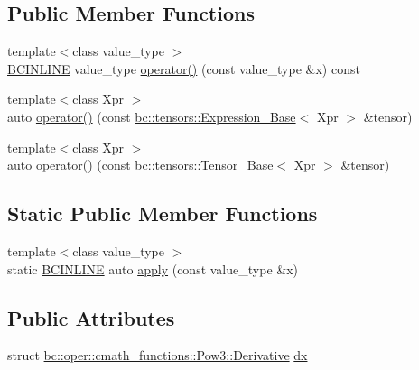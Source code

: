 \subsection*{Public Member Functions}
\begin{DoxyCompactItemize}
\item 
{\footnotesize template$<$class value\+\_\+type $>$ }\\\hyperlink{common_8h_a6699e8b0449da5c0fafb878e59c1d4b1}{B\+C\+I\+N\+L\+I\+NE} value\+\_\+type \hyperlink{structbc_1_1oper_1_1cmath__functions_1_1Pow3_a108deaaf09f199af0335f01bec74c858}{operator()} (const value\+\_\+type \&x) const
\item 
{\footnotesize template$<$class Xpr $>$ }\\auto \hyperlink{structbc_1_1oper_1_1cmath__functions_1_1Pow3_a98c1195eb689341c75c61c9f69c01a91}{operator()} (const \hyperlink{classbc_1_1tensors_1_1Expression__Base}{bc\+::tensors\+::\+Expression\+\_\+\+Base}$<$ Xpr $>$ \&tensor)
\item 
{\footnotesize template$<$class Xpr $>$ }\\auto \hyperlink{structbc_1_1oper_1_1cmath__functions_1_1Pow3_ac310abee8b6a40eb5bf6c2bed2395107}{operator()} (const \hyperlink{classbc_1_1tensors_1_1Tensor__Base}{bc\+::tensors\+::\+Tensor\+\_\+\+Base}$<$ Xpr $>$ \&tensor)
\end{DoxyCompactItemize}
\subsection*{Static Public Member Functions}
\begin{DoxyCompactItemize}
\item 
{\footnotesize template$<$class value\+\_\+type $>$ }\\static \hyperlink{common_8h_a6699e8b0449da5c0fafb878e59c1d4b1}{B\+C\+I\+N\+L\+I\+NE} auto \hyperlink{structbc_1_1oper_1_1cmath__functions_1_1Pow3_a703f46549919b7bd1d6880c13c240d76}{apply} (const value\+\_\+type \&x)
\end{DoxyCompactItemize}
\subsection*{Public Attributes}
\begin{DoxyCompactItemize}
\item 
struct \hyperlink{structbc_1_1oper_1_1cmath__functions_1_1Pow3_1_1Derivative}{bc\+::oper\+::cmath\+\_\+functions\+::\+Pow3\+::\+Derivative} \hyperlink{structbc_1_1oper_1_1cmath__functions_1_1Pow3_a03dee12fbde331ad03bd4bc4c8fe1df4}{dx}
\end{DoxyCompactItemize}



